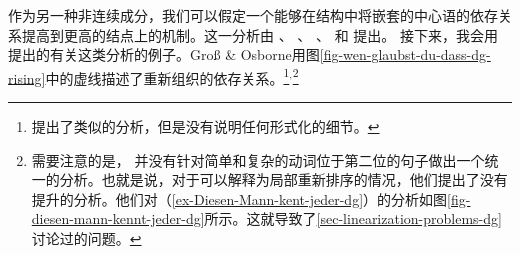 作为另一种非连续成分，我们可以假定一个能够在结构中将嵌套的中心语的依存关系提高到更高的结点上的机制。这一分析由 \citet{Kunze68a-u}、 \citet{Hudson97a,Hudson2000a}、 \citet{Kahane97a}、 \citet{KNR98a}和 \citet{GO2009a}提出。
接下来，我会用 \citet{GO2009a}提出的有关这类分析的例子。Groß \& Osborne用图\vref{fig-wen-glaubst-du-dass-dg-rising}中的虚线描述了重新组织的依存关系。\footnote{%
 \citet[]{EH2003a}提出了类似的分析，但是没有说明任何形式化的细节。
}$^,$\footnote{%
需要注意的是， \citet{GO2009a}并没有针对简单和复杂的动词位于第二位的句子做出一个统一的分析。也就是说，对于可以解释为局部重新排序的情况，他们提出了没有提升的分析。他们对（\ref{ex-Diesen-Mann-kent-jeder-dg}）的分析如图\ref{fig-diesen-mann-kennt-jeder-dg}所示。这就导致了\ref{sec-linearization-problems-dg}讨论过的问题。
}
